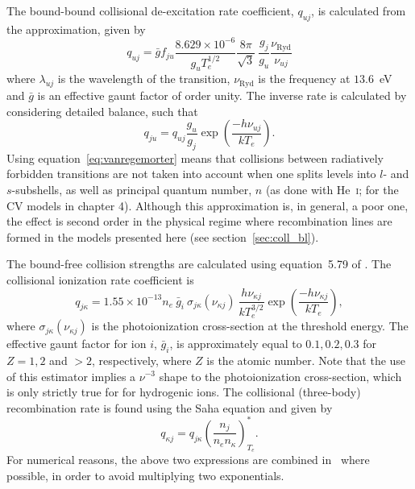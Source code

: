 The bound-bound collisional de-excitation rate coefficient, $q_{uj}$, is calculated from the
\cite{vanregemorter} approximation, given by
\begin{equation}
q_{uj} = \bar{g} f_{ju}\frac{8.629\times10^{-6}}{g_u T_e^{1/2}}
\frac{8 \pi}{\sqrt{3}}~\frac{g_j}{g_u} \frac{\nu_{\mathrm{Ryd}}}{\nu_{uj}}
\label{eq:vanregemorter}
\end{equation}
where $\lambda_{uj}$ is the wavelength of the transition, $\nu_{\mathrm{Ryd}}$
is the frequency at $13.6$~eV and $\bar{g}$ is 
an effective gaunt factor of order unity. 
The inverse rate is calculated by considering detailed balance, 
such that
\begin{equation}
q_{ju} = q_{uj} \frac{g_u}{g_j} \exp \left( \frac{-h \nu_{uj}}{k T_e} \right).
\label{eq:vanregemorter2}
\end{equation}
Using equation~\ref{eq:vanregemorter} means that collisions between radiatively
forbidden transitions are not taken into account when one 
splits levels into $l$- and $s$-subshells, as well
as principal quantum number, $n$ (as done with He~\textsc{i}; 
for the CV models in chapter 4). Although this approximation is, in general, 
a poor one, the effect is second order in the physical 
regime where recombination lines are formed in the models presented here 
(see section~\ref{sec:coll_bl}).

The bound-free collision strengths are calculated using equation~5.79 of
\cite{mihalas}. The collisional ionization rate coefficient is
\begin{equation}
q_{j\kappa} = 1.55 \times 10^{-13} n_e~\bar{g}_{i}~\sigma_{j\kappa} (\nu_{\kappa j})~
\frac{h \nu_{\kappa j}}{k T_e^{3/2}}
\exp \left( \frac{- h \nu_{\kappa j}}{k T_e} \right),
\label{eq:qioniz}
\end{equation}
where $\sigma_{j\kappa} (\nu_{\kappa j})$ is the photoionization cross-section 
at the threshold energy.
The effective gaunt factor for ion $i$, $\bar{g}_{i}$, is approximately
equal to $0.1,0.2,0.3$ for $Z=1,2$ and $>2$, respectively,
where $Z$ is the atomic number. Note that the use of this estimator
implies a $\nu^{-3}$ shape to the photoionization cross-section,
which is only strictly true for for hydrogenic ions.
The collisional (three-body) recombination rate is found using the Saha equation
and given by
\begin{equation}
q_{\kappa j} = q_{j\kappa} \left( \frac{n_j}{n_e n_\kappa} \right)^*_{T_e}.
\label{eq:qrecomb}
\end{equation}
For numerical reasons, the above two expressions are combined in \py\ where 
possible, in order to avoid multiplying two exponentials.




